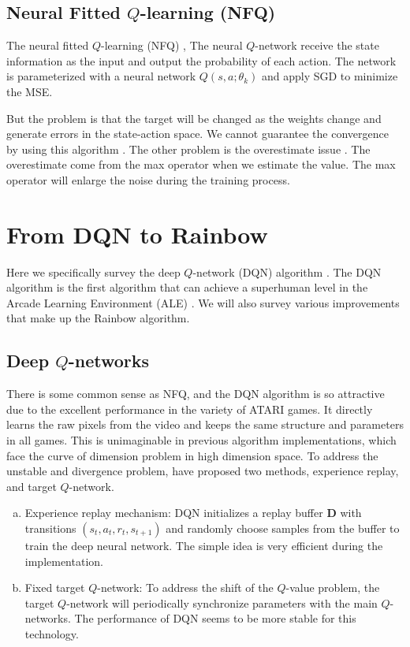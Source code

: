\documentclass{article}
\begin{document}
\subsection{Neural Fitted $Q$-learning (NFQ)}
The neural fitted $Q$-learning (NFQ) \citep{riedmiller2005neural}, The neural  $Q$-network  receive the state information as the input and  output the probability of each action. The network is parameterized with a neural network $Q(s,a;\theta_k)$ and apply SGD to minimize the MSE. 

But the problem is that the target will be changed as the weights change and generate errors in the state-action space.  We cannot guarantee the convergence by using this algorithm \citep{baird1995residual, tsitsiklis1997analysis, gordon1996stable, riedmiller2005neural}. The other problem is the overestimate issue \citep{van2016deep}. The overestimate come from the max operator when we estimate the value. The max operator will enlarge the noise during the training process.

%
\section{From DQN to Rainbow}
\label{sec:From DQN to Rainbow}

Here we specifically survey the deep $Q$-network (DQN) algorithm \citep{mnih2015human}. The DQN algorithm is the first algorithm that can achieve a superhuman level in the Arcade Learning Environment (ALE) \citep{bellemare2013arcade}. We will also survey various improvements that make up the Rainbow algorithm.

\subsection{Deep $Q$-networks}

There is some common sense as NFQ, and the DQN algorithm is so attractive due to the excellent performance in the variety of ATARI games. It directly learns the raw pixels from the video and keeps the same structure and parameters in all games.  This is unimaginable in previous algorithm implementations, which face the curve of dimension problem in high dimension space. 
To address the unstable and divergence problem, \citep{mnih2015human} have proposed two methods, experience replay, and target $Q$-network.



\begin{enumerate}[(a)]
	\item Experience replay mechanism: DQN initializes a replay buffer $\mathbf{D}$ with transitions $(s_t, a_t, r_t, s_{t+1})$ and randomly choose samples from the buffer to train the deep neural network. The simple idea is very efficient during the implementation.
	
	\item Fixed target $Q$-network: To address the shift of the $Q$-value problem, the target $Q$-network will periodically synchronize parameters with the main $Q$-networks. The performance of DQN seems to be more stable for this technology.
	
\end{enumerate}
\end{document}
